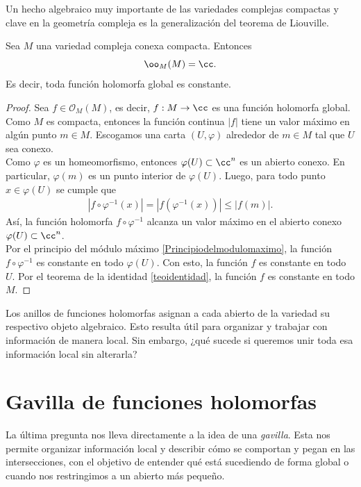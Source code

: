     Un hecho algebraico muy importante de las variedades complejas compactas y clave en la geometría compleja es la generalización del teorema de Liouville.

    \begin{theorem}\label{holomorfasglobal}
        Sea $M$ una variedad compleja conexa compacta. Entonces
        \begin{equation*}
            \oo_M(M)=\cc.
        \end{equation*}
        Es decir, toda función holomorfa global es constante. 
    \end{theorem}
	\begin{proof}
		Sea $f\in \mathscr{O}_M(M)$, es decir, $f:M\to\cc$ es una función holomorfa global.
		Como $M$ es compacta, entonces la función continua $|f|$ tiene un valor máximo en algún punto $m\in M$.
		Escogamos una carta $(U,\varphi)$ alrededor de $m\in M$ tal que $U$ sea conexo.\\
		Como $\varphi$ es un homeomorfismo, entonces $\varphi(U)\subset\cc^n$ es un abierto conexo. En particular, $\varphi(m)$ es un punto interior de $\varphi(U)$. Luego, para todo punto $x\in \varphi(U)$ se cumple que
		\begin{align*}
			|f\circ \varphi^{-1}(x)|=|f(\varphi^{-1}(x))|\leq |f(m)|.
		\end{align*}
		Así, la función holomorfa $f\circ\varphi^{-1}$ alcanza un valor máximo en el abierto conexo $\varphi(U)\subset\cc^n$.\\
		Por el principio del módulo máximo \ref{Principiodelmodulomaximo}, la función $f\circ\varphi^{-1}$ es constante en todo $\varphi(U)$. Con esto, la función $f$ es constante en todo $U$. Por el teorema de la identidad \ref{teoidentidad}, la función $f$ es constante en todo $M$.
	\end{proof}

    Los anillos de funciones holomorfas asignan a cada abierto de la variedad su respectivo objeto algebraico. Esto resulta útil para organizar y trabajar con información de manera local. Sin embargo, ¿qué sucede si queremos unir toda esa información local sin alterarla?

\section{Gavilla de funciones holomorfas}

    La última pregunta nos lleva directamente a la idea de una \textit{gavilla}. Esta nos permite organizar información local y describir cómo se comportan y pegan en las intersecciones, con el objetivo de entender qué está sucediendo de forma global o cuando nos restringimos a un abierto más pequeño.

